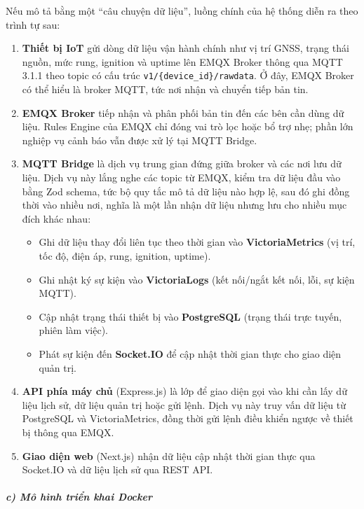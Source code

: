 \documentclass[a4paper]{extarticle}
\providecommand{\tightlist}{%
  \setlength{\itemsep}{0pt}\setlength{\parskip}{0pt}}
\begin{document}
Nếu mô tả bằng một ``câu chuyện dữ liệu'', luồng chính của hệ thống diễn
ra theo trình tự sau:

\begin{enumerate}
\def\labelenumi{\arabic{enumi}.}
\tightlist
\item
  \textbf{Thiết bị IoT} gửi dòng dữ liệu vận hành chính như vị trí GNSS,
  trạng thái nguồn, mức rung, ignition và uptime lên EMQX Broker thông
  qua MQTT 3.1.1 theo topic có cấu trúc
  \texttt{v1/\{device\_id\}/rawdata}. Ở đây, EMQX Broker có thể hiểu là
  broker MQTT, tức nơi nhận và chuyển tiếp bản tin.
\item
  \textbf{EMQX Broker} tiếp nhận và phân phối bản tin đến các bên cần
  dùng dữ liệu. Rules Engine của EMQX chỉ đóng vai trò lọc hoặc bổ trợ
  nhẹ; phần lớn nghiệp vụ cảnh báo vẫn được xử lý tại MQTT Bridge.
\item
  \textbf{MQTT Bridge} là dịch vụ trung gian đứng giữa broker và các nơi
  lưu dữ liệu. Dịch vụ này lắng nghe các topic từ EMQX, kiểm tra dữ liệu
  đầu vào bằng Zod schema, tức bộ quy tắc mô tả dữ liệu nào hợp lệ, sau
  đó ghi đồng thời vào nhiều nơi, nghĩa là một lần nhận dữ liệu nhưng
  lưu cho nhiều mục đích khác nhau:

  \begin{itemize}
  \tightlist
  \item
    Ghi dữ liệu thay đổi liên tục theo thời gian vào
    \textbf{VictoriaMetrics} (vị trí, tốc độ, điện áp, rung, ignition,
    uptime).
  \item
    Ghi nhật ký sự kiện vào \textbf{VictoriaLogs} (kết nối/ngắt kết nối,
    lỗi, sự kiện MQTT).
  \item
    Cập nhật trạng thái thiết bị vào \textbf{PostgreSQL} (trạng thái
    trực tuyến, phiên làm việc).
  \item
    Phát sự kiện đến \textbf{Socket.IO} để cập nhật thời gian thực cho
    giao diện quản trị.
  \end{itemize}
\item
  \textbf{API phía máy chủ} (Express.js) là lớp để giao diện gọi vào khi cần
  lấy dữ liệu lịch sử, dữ liệu quản trị hoặc gửi lệnh. Dịch vụ này truy
  vấn dữ liệu từ PostgreSQL và VictoriaMetrics, đồng thời gửi lệnh điều
  khiển ngược về thiết bị thông qua EMQX.
\item
  \textbf{Giao diện web} (Next.js) nhận dữ liệu cập nhật thời gian thực qua
  Socket.IO và dữ liệu lịch sử qua REST API.
\end{enumerate}

\subparagraph{c) Mô hình triển khai
Docker}\label{c-muxf4-huxecnh-triux1ec3n-khai-docker}
\end{document}
